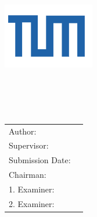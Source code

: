\begin{titlepage}
\centering
\vspace{40mm}
\includegraphics[width=40mm]{./includes/logo/tum} \\
\vspace{5mm}
{\huge\MakeUppercase{\getFaculty{}}}\\
\vspace{5mm}
{\large\MakeUppercase{\getUniversity{}}}\\
\vspace{20mm}
{\Large \getDoctype{}} \\
\vspace{15mm}
{\huge\bfseries \getTitle{}} \\
\vspace{15mm}
\begin{tabular}{l l}
Author: & \getAuthor{} \\
Supervisor: & \getSupervisor{} \\
Submission Date: & \getSubmissionDate{} \\ \hline
Chairman: & \getChairman{} \\
1. Examiner: & \getFirstExaminer{} \\
2. Examiner: & \getSecondExaminer{} \\
\end{tabular}
\end{titlepage}